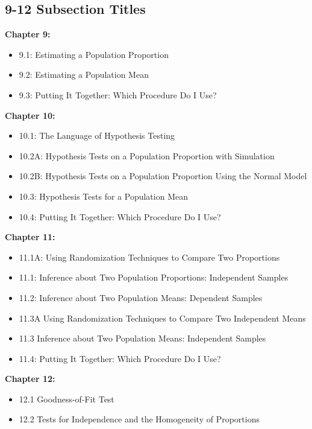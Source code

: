 \documentclass{report}
\begin{document}
        \pagebreak 
        \subsection*{9-12 Subsection Titles}
        \bigbreak \noindent 
        \textbf{Chapter 9:}
        \begin{itemize}
          \item 9.1: Estimating a Population Proportion
          \item 9.2: Estimating a Population Mean
          \item 9.3: Putting It Together: Which Procedure Do I Use?
        \end{itemize}
        \bigbreak \noindent 
        \textbf{Chapter 10:}
        \begin{itemize}
          \item 10.1: The Language of Hypothesis Testing
          \item 10.2A: Hypothesis Tests on a Population Proportion with Simulation
          \item 10.2B: Hypothesis Tests on a Population Proportion Using the Normal Model
          \item 10.3: Hypothesis Tests for a Population Mean
          \item 10.4: Putting It Together: Which Procedure Do I Use?
        \end{itemize}
        \bigbreak \noindent 
        \textbf{Chapter 11:}
        \begin{itemize}
          \item 11.1A: Using Randomization Techniques to Compare Two Proportions
          \item 11.1: Inference about Two Population Proportions: Independent Samples
          \item 11.2: Inference about Two Population Means: Dependent Samples
          \item 11.3A Using Randomization Techniques to Compare Two Independent Means
          \item 11.3 Inference about Two Population Means: Independent Samples
          \item 11.4: Putting It Together: Which Procedure Do I Use?
        \end{itemize}
        \bigbreak \noindent 
        \textbf{Chapter 12:}
        \begin{itemize}
          \item 12.1 Goodness-of-Fit Test
          \item 12.2 Tests for Independence and the Homogeneity of Proportions
        \end{itemize}
\end{document}
